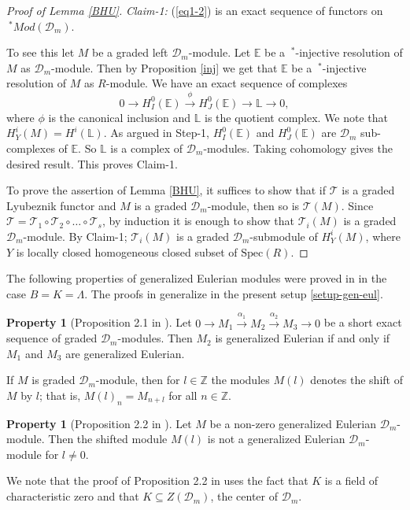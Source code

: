 \documentclass{amsart}
\newcommand{\D}{\mathcal{D} }
\newcommand{\rt}{\rightarrow}
\theoremstyle{plain}
\theoremstyle{definition}
\newtheorem{property}[theorem]{Property}
\theoremstyle{remark}
\begin{document}
\begin{proof}[Proof of Lemma \ref{BHU}]
\textit{Claim-1:} (\ref{eq1-2}) is an exact sequence of functors on  $\ ^* Mod(\D_m)$.

To see this let $M$ be a graded left $\D_m$-module.
Let $\mathbb{E}$ be a $ \ ^*$-injective resolution of $M$ as $\D_m$-module. Then by Proposition \ref{inj}
 we get that $\mathbb{E}$ be a $ \ ^*$-injective resolution of $M$ as $R$-module. We have an exact sequence of complexes
 \begin{equation}\label{d-loc-closed}
  0 \rt H^0_I(\mathbb{E}) \xrightarrow{\phi} H^0_J(\mathbb{E}) \rt \mathbb{L} \rt 0,
 \end{equation}
where $\phi$ is the canonical inclusion and $\mathbb{L}$ is the quotient complex. We note that $H^i_Y(M) = H^i(\mathbb{L})$.
As argued in Step-1,
$H^0_I(\mathbb{E})$ and $H^0_J(\mathbb{E})$ are $\D_m$ sub-complexes of $\mathbb{E}$. So $\mathbb{L}$ is a complex of $\D_m$-modules.
Taking cohomology gives the desired result. This proves Claim-1.


 
 To prove the assertion of Lemma  \ref{BHU},     it suffices to show that if $\mathcal{T}$ is a graded Lyubeznik functor
and $M$ is a graded  $\D_m$-module, then so is $\mathcal{T}(M)$. 
Since $\mathcal{T}= \mathcal{T}_1\circ \mathcal{T}_2 \circ \ldots \circ \mathcal{T}_s$, 
by induction it is enough to show that $\mathcal{T}_i(M)$ is a graded $\D_m$-module.
By Claim-1;  $\mathcal{T}_i(M)$ is a graded $\D_m$-submodule of $H_Y^i(M)$, where $Y$ is locally closed homogeneous
closed subset of $\text{Spec}(R)$. 
\end{proof}





The following properties of generalized Eulerian modules were proved in \cite{P2} in the case $B = K = \Lambda$.
The  proofs in \cite{P2} generalize in the present setup \ref{setup-gen-eul}.


\begin{property}[Proposition 2.1 in \cite{P2}] \label{property1} Let
$0 \rightarrow M_1 \overset{{\alpha_1}}{\rightarrow} M_2 \overset{{\alpha_2}}{\rightarrow} M_3 {\rightarrow} 0 $ be a
short exact sequence of graded $\D_m$-modules. Then $M_2$ is generalized Eulerian
 if and only if $M_1$ and $M_3$ are generalized Eulerian.
\end{property}

If $M$ is graded $\D_m$-module, then for $l\in \mathbb{Z}$ the modules $M(l)$ denotes the shift of $M$ by $l$; that 
is, $M(l)_n=M_{n+l}$ for all $n\in \mathbb{Z}.$
\begin{property}[Proposition 2.2 in \cite{P2}]\label{property2}
Let $M$ be a non-zero generalized Eulerian $\D_m$-module. Then the shifted module $M(l)$ is not a generalized 
Eulerian $\D_m$-module for $l \neq 0$.
\end{property}
We note that the proof of Proposition 2.2  in \cite{P2} uses the fact that $K$ is a field of characteristic zero and that 
$K \subseteq Z(\D_m)$, the center of $\D_m$.
\end{document}
